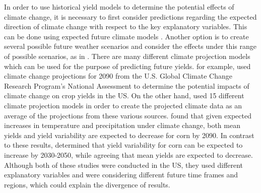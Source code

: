 In order to use historical yield models to determine the potential effects of climate change, it is necessary to first consider predictions regarding the expected direction of climate change with respect to the key explanatory variables. This can be done using expected future climate models  \citep{chen2004yield}. Another option is to create several possible future weather scenarios and consider the effects under this range of possible scenarios, as in \cite{li2014climate}. There are many different climate projection models which can be used for the purpose of predicting future yields.  \cite{chen2004yield} for example, used climate change projections for 2090 from the U.S. Global Climate Change Research Program’s National Assessment to determine the potential impacts of climate change on crop yields in the US. On the other hand, \cite{urban2012projected} used 15 different climate projection models in order to create the projected climate data as an average of the projections from these various sources. \cite{chen2004yield} found that given expected increases in temperature and precipitation under climate change, both mean yields and yield variability are expected to decrease for corn by 2090. In contrast to these results, \cite{urban2012projected} determined that yield variability for corn can be expected to increase by 2030-2050, while agreeing that mean yields are expected to decrease. Although both of these studies were conducted in the US, they used different explanatory variables and were considering different future time frames and regions, which could explain the divergence of results. 


